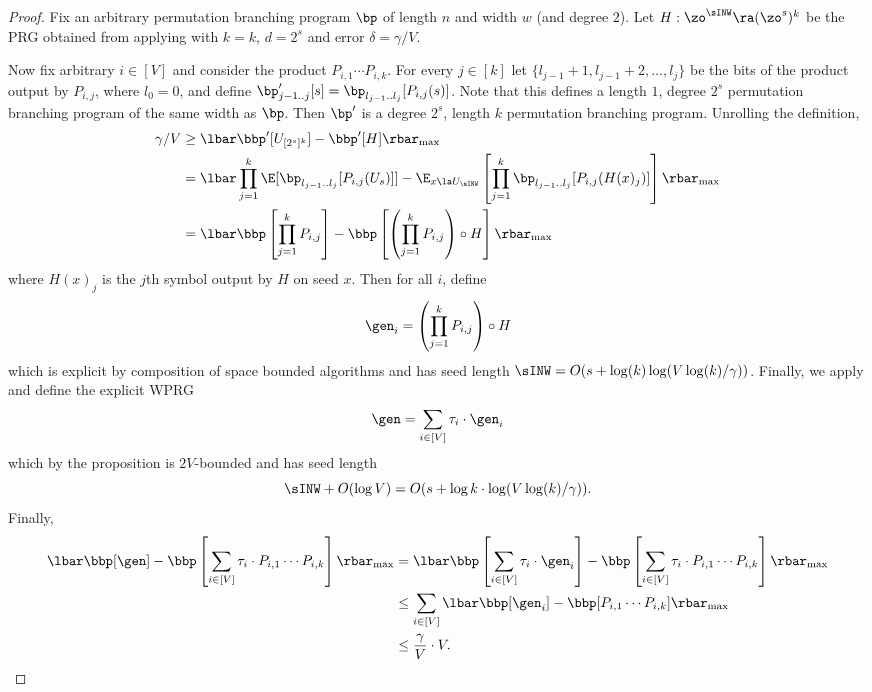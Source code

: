 \documentclass{toc}
\begin{document}
\begin{proof}
Fix an arbitrary permutation branching program $\bp$ of length $n$ and width $w$ (and degree $2$). Let $H:\zo^{\sINW}\ra (\zo^s)^k$ be the PRG obtained from applying  with $k=k$, $d=2^s$ and error $\delta=\gamma/V$.

Now fix arbitrary $i \in [V]$ and consider the product $P_{i,1}\cdots P_{i,k}$. For every $j\in[k]$ let $\{l_{j-1}+1,l_{j-1}+2,\ldots,l_j\}$ be the bits of the product output by $P_{i,j}$, where $l_{0}=0$, and define $\bp'_{j-1..j}[s]=\bp_{l_{j-1}..l_j}[P_{i,j}(s)]$. Note that this defines a length $1$, degree $2^s$ permutation branching program of the same width as $\bp$.
Then $\bp'$ is a degree $2^s$, length $k$ permutation branching program. Unrolling the definition,
\begin{align*}
    \gamma/V &\geq \lbar\bbp'[U_{[2^s]^k}]-\bbp'[H]\rbar_{\max}\\
    &= \lbar \prod_{j=1}^k\E[\bp_{l_{j-1}..l_j}[P_{i,j}(U_s)]] - \E_{x\la U_{\sINW}}\left[ \prod_{j=1}^k\bp_{l_{j-1}..l_j}[P_{i,j}(H(x)_j)]\right]\rbar_{\max}\\
    &= \lbar\bbp\left[\prod_{j=1}^k P_{i,j}\right] - \bbp\left[\left(\prod_{j=1}^k P_{i,j}\right)\circ H\right]\rbar_{\max}
\end{align*}
where $H(x)_j$ is the $j$th symbol output by $H$ on seed $x$. Then for all $i$, define 
\[\gen_i=\left(\prod_{j=1}^k P_{i,j}\right)\circ H\]
which is explicit by composition of space bounded algorithms and has seed length $\sINW=O(s+\log(k)\log(V\log(k)/\gamma))$.
Finally, we apply  and define the explicit WPRG
$$\gen=\sum_{i\in [V]} \tau_i \cdot \gen_i$$
which by the proposition is $2V$-bounded and has seed length \[\sINW+O(\log V)=O(s+\log k\cdot\log(V\log(k)/\gamma)).\]
Finally, 
\begin{align*}
    \lbar \bbp[\gen]-\bbp\left[\sum_{i\in[V]}\tau_i\cdot P_{i,1}\cdots P_{i,k}\right]\rbar_{\max} &=
    \lbar \bbp\left[\sum_{i\in[V]}\tau_i \cdot\gen_i\right]-\bbp\left[\sum_{i\in[V]}\tau_i\cdot P_{i,1}\cdots P_{i,k}\right]\rbar_{\max}\\ 
    &\leq \sum_{i\in [V]}\lbar \bbp[\gen_i] - \bbp[P_{i,1}\cdots P_{i,k}]\rbar_{\max}\\
    &\leq \frac{\gamma}{V}\cdot V. \qedhere 
\end{align*}
\end{proof}
\end{document}
